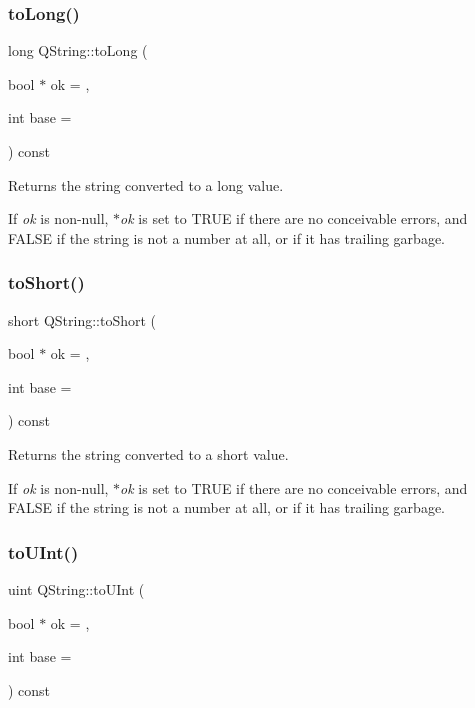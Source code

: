\subsubsection{\texorpdfstring{toLong()}{toLong()}}
{\footnotesize\ttfamily long Q\+String\+::to\+Long (\begin{DoxyParamCaption}\item[{bool $\ast$}]{ok = {},  }\item[{int}]{base = {} }\end{DoxyParamCaption}) const}

Returns the string converted to a {\ttfamily long} value.

If {\itshape ok} is non-\/null, {\itshape $\ast$ok} is set to T\+R\+UE if there are no conceivable errors, and F\+A\+L\+SE if the string is not a number at all, or if it has trailing garbage. \mbox{\label{class_q_string_aba480e0d80d25f65e2acebb03d0d7ab5}} 
\subsubsection{\texorpdfstring{toShort()}{toShort()}}
{\footnotesize\ttfamily short Q\+String\+::to\+Short (\begin{DoxyParamCaption}\item[{bool $\ast$}]{ok = {},  }\item[{int}]{base = {} }\end{DoxyParamCaption}) const}

Returns the string converted to a {\ttfamily short} value.

If {\itshape ok} is non-\/null, {\itshape $\ast$ok} is set to T\+R\+UE if there are no conceivable errors, and F\+A\+L\+SE if the string is not a number at all, or if it has trailing garbage. \mbox{\label{class_q_string_abe1e887f24348b6b7ef69b7036707b6b}} 
\subsubsection{\texorpdfstring{toUInt()}{toUInt()}}
{\footnotesize\ttfamily uint Q\+String\+::to\+U\+Int (\begin{DoxyParamCaption}\item[{bool $\ast$}]{ok = {},  }\item[{int}]{base = {} }\end{DoxyParamCaption}) const}

